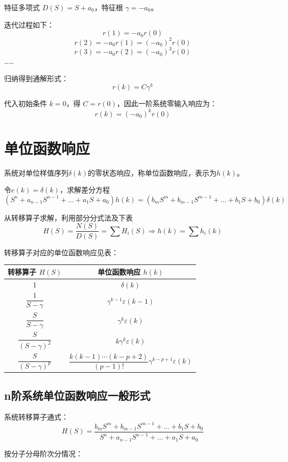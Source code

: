\documentclass[UTF8]{ctexart}
\begin{document}
特征多项式 $D(S)=S+a_{0}$，特征根 $\gamma=-a_0$。

迭代过程如下：
$$
r(1)=-a_{0} r(0)
$$
$$
r(2)=-a_{0} r(1)=\left(-a_{0}\right)^{2} r(0)
$$
$$
r(3)=-a_{0} r(2)=\left(-a_{0}\right)^{3} r(0)
$$
……

归纳得到通解形式：
$$
r(k)=C \gamma^{k}
$$

代入初始条件 $k=0$，得 $C=r(0)$，因此一阶系统零输入响应为：
$$
r(k)=\left(-a_{0}\right)^{k} r(0)
$$

\section{单位函数响应}

系统对单位样值序列$\delta(k)$的零状态响应，称单位函数响应，表示为$h(k)$。

令$e(k)=\delta(k)$，求解差分方程
$$
\left(S^{n}+a_{n-1} S^{n-1}+\dots+a_{1} S+a_{0}\right) h(k)=\left(b_mS^{m}+b_{m-1} S^{m-1}+\dots+b_{1}S+b_{0}\right) \delta(k)
$$

从转移算子求解，利用部分分式法及下表
$$
H(S)=\frac{N(S)}{D(S)}=\sum H_{i}(S) \Rightarrow h(k)=\sum h_{i}(k)
$$

转移算子对应的单位函数响应见表：

\begin{table}[H]
\centering
\begin{tabular}{c|c}
\hline
\textbf{转移算子 $H(S)$} & \textbf{单位函数响应 $h(k)$} \\
\hline
1 & $\delta(k)$ \\
\hline
$\dfrac{1}{S-\gamma}$ & $\gamma^{k-1} \varepsilon(k-1)$ \\
\hline
$\dfrac{S}{S-\gamma}$ & $\gamma^k \varepsilon(k)$ \\
\hline
$\dfrac{S}{(S-\gamma)^2}$ & $k\gamma^k \varepsilon(k)$ \\
\hline
$\dfrac{S}{(S-\gamma)^p}$ & $\dfrac{k(k-1)\cdots(k-p+2)}{(p-1)!}\gamma^{k-p+1}\varepsilon(k)$ \\
\hline
\end{tabular}
\end{table}

\subsection{n阶系统单位函数响应一般形式}
系统转移算子通式：
$$
H(S)=\frac{b_{m} S^{m}+b_{m-1} S^{m-1}+\dots+b_{1} S+b_{0}}{S^{n}+a_{n-1} S^{n-1}+\dots+a_{1} S+a_{0}}
$$

按分子分母阶次分情况：
\end{document}
